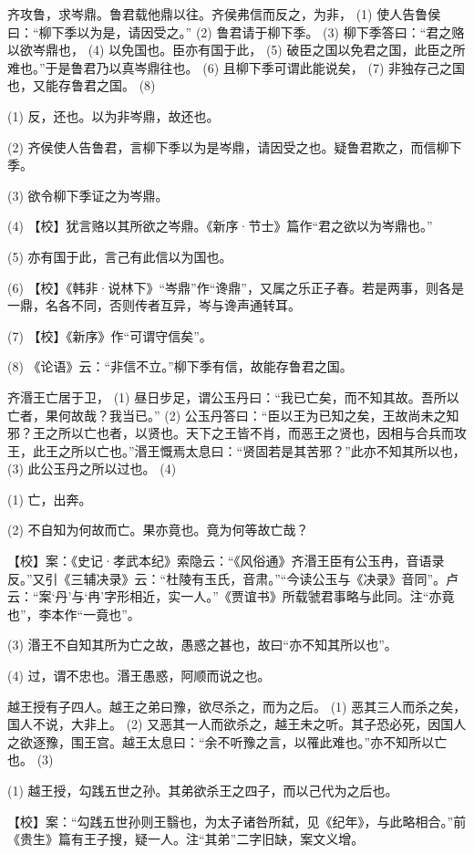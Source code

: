 \documentclass[12pt,UTF8]{ctexbook}
\begin{document}
齐攻鲁，求岑鼎。鲁君载他鼎以往。齐侯弗信而反之，为非， (1) 使人告鲁侯曰：“柳下季以为是，请因受之。” (2) 鲁君请于柳下季。 (3) 柳下季答曰：“君之赂以欲岑鼎也， (4) 以免国也。臣亦有国于此， (5) 破臣之国以免君之国，此臣之所难也。”于是鲁君乃以真岑鼎往也。 (6) 且柳下季可谓此能说矣， (7) 非独存己之国也，又能存鲁君之国。 (8)

(1) 反，还也。以为非岑鼎，故还也。

(2) 齐侯使人告鲁君，言柳下季以为是岑鼎，请因受之也。疑鲁君欺之，而信柳下季。

(3) 欲令柳下季证之为岑鼎。

(4) 【校】犹言赂以其所欲之岑鼎。《新序·节士》篇作“君之欲以为岑鼎也。”

(5) 亦有国于此，言己有此信以为国也。

(6) 【校】《韩非·说林下》“岑鼎”作“谗鼎”，又属之乐正子春。若是两事，则各是一鼎，名各不同，否则传者互异，岑与谗声通转耳。

(7) 【校】《新序》作“可谓守信矣”。

(8) 《论语》云：“非信不立。”柳下季有信，故能存鲁君之国。

齐湣王亡居于卫， (1) 昼日步足，谓公玉丹曰：“我已亡矣，而不知其故。吾所以亡者，果何故哉？我当已。” (2) 公玉丹答曰：“臣以王为已知之矣，王故尚未之知邪？王之所以亡也者，以贤也。天下之王皆不肖，而恶王之贤也，因相与合兵而攻王，此王之所以亡也。”湣王慨焉太息曰：“贤固若是其苦邪？”此亦不知其所以也， (3) 此公玉丹之所以过也。 (4)

(1) 亡，出奔。

(2) 不自知为何故而亡。果亦竟也。竟为何等故亡哉？

【校】案：《史记·孝武本纪》索隐云：“《风俗通》齐湣王臣有公玉冉，音语录反。”又引《三辅决录》云：“杜陵有玉氏，音肃。”“今读公玉与《决录》音同”。卢云：“案‘丹’与‘冉’字形相近，实一人。”《贾谊书》所载虢君事略与此同。注“亦竟也”，李本作“一竟也”。

(3) 湣王不自知其所为亡之故，愚惑之甚也，故曰“亦不知其所以也”。

(4) 过，谓不忠也。湣王愚惑，阿顺而说之也。

越王授有子四人。越王之弟曰豫，欲尽杀之，而为之后。 (1) 恶其三人而杀之矣，国人不说，大非上。 (2) 又恶其一人而欲杀之，越王未之听。其子恐必死，因国人之欲逐豫，围王宫。越王太息曰：“余不听豫之言，以罹此难也。”亦不知所以亡也。 (3)

(1) 越王授，勾践五世之孙。其弟欲杀王之四子，而以己代为之后也。

【校】案：“勾践五世孙则王翳也，为太子诸咎所弑，见《纪年》，与此略相合。”前《贵生》篇有王子搜，疑一人。注“其弟”二字旧缺，案文义增。
\end{document}
